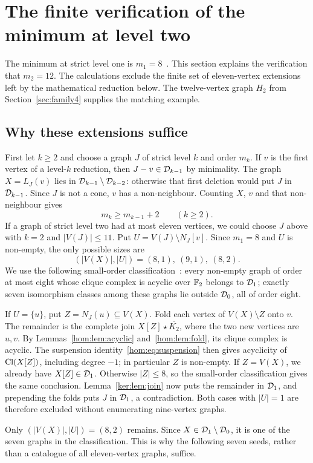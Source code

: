 \section{The finite verification of the minimum at level two}\label{sec:minimum}
The minimum at strict level one is $m_1=8$~\cite{DEFH2023}.
This section explains the verification that $m_2=12$. The calculations
exclude the finite set of eleven-vertex extensions left by the
mathematical reduction below. The twelve-vertex graph $H_2$ from
Section~\ref{sec:family4} supplies the matching example.

\subsection{Why these extensions suffice}
First let $k\geq2$ and choose a graph $J$ of strict level $k$ and order $m_k$.
If $v$ is the first vertex of a level-$k$ reduction, then $J-v\in\mathcal D_{k-1}$
by minimality. The graph $X=L_J(v)$ lies in $\mathcal D_{k-1}\setminus\mathcal D_{k-2}$:
otherwise that first deletion would put $J$ in $\mathcal D_{k-1}$. Since $J$ is not
a cone, $v$ has a non-neighbour. Counting $X$, $v$ and that non-neighbour gives
\[
 m_k\geq m_{k-1}+2\qquad(k\geq2).
\]
If a graph of strict level two had at most eleven vertices, we could choose
$J$ above with $k=2$ and $|V(J)|\leq11$. Put
$U=V(J)\setminus N_J[v]$. Since $m_1=8$ and $U$ is non-empty,
the only possible sizes are
\[
 (|V(X)|,|U|)=(8,1),\ (9,1),\ (8,2).
\]
We use the following small-order classification~\cite{DEFH2023}:
every non-empty graph of order at most eight whose clique complex is acyclic
over $\mathbb F_2$ belongs to $\mathcal D_1$; exactly seven isomorphism classes among these
graphs lie outside $\mathcal D_0$, all of order eight.

If $U=\{u\}$, put $Z=N_J(u)\subseteq V(X)$. Fold each vertex of
$V(X)\setminus Z$ onto $v$. The remainder is the complete join
$X[Z]\star\overline{K_2}$, where the two new vertices are $u,v$.
By Lemmas~\ref{hom:lem:acyclic} and~\ref{hom:lem:fold}, its clique complex
is acyclic. The suspension identity~\eqref{hom:eq:suspension} then gives
acyclicity of $\operatorname{Cl}(X[Z])$, including degree $-1$; in particular $Z$ is non-empty.
If $Z=V(X)$, we already have $X[Z]\in\mathcal D_1$. Otherwise $|Z|\leq8$, so the
small-order classification gives the same conclusion. Lemma~\ref{ker:lem:join}
now puts the remainder in $\mathcal D_1$, and prepending the folds puts $J$ in $\mathcal D_1$,
a contradiction. Both cases with $|U|=1$ are therefore excluded without
enumerating nine-vertex graphs.

Only $(|V(X)|,|U|)=(8,2)$ remains. Since $X\in\mathcal D_1\setminus\mathcal D_0$, it is
one of the seven graphs in the classification. This is why the following
seven seeds, rather than a catalogue of all eleven-vertex graphs, suffice.


